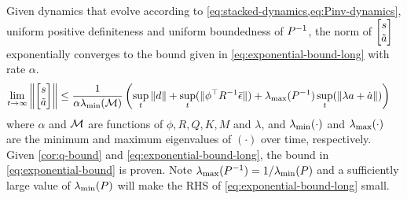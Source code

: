 \begin{theorem}
\label{thm:s-stability}
Given dynamics that evolve according to \cref{eq:stacked-dynamics,eq:Pinv-dynamics}, uniform positive definiteness and uniform boundedness of $P^{-1}$, the norm of $\begin{bmatrix}  s \\ \tilde{ a} \end{bmatrix}$ exponentially converges to the bound given in \cref{eq:exponential-bound-long} with rate $\alpha$.
\begin{align}
    \label{eq:exponential-bound-long}
    \lim_{t\rightarrow\infty}\left\|\begin{bmatrix}  s \\ \tilde{ a} \end{bmatrix}\right\| &\leq \frac{1}{\alpha \lambda_\text{\normalfont{min}}(\mathcal{M})}
    \left( \sup_t\| d\| + \sup_t(\|\phi^\top R^{-1} \bar{\epsilon}\|) + \lambda_\text{\normalfont{max}}(P^{-1})\sup_t(\|\lambda  a + \dot{ a}\|) \right)
\end{align}
where $\alpha$ and $\mathcal{M}$ are functions of $\phi, R, Q, K, M$ and $\lambda$, and $\lambda_\text{\normalfont{min}}(\cdot)$ and $\lambda_\text{\normalfont{max}}(\cdot)$ are the minimum and maximum eigenvalues of $(\cdot)$ over time, respectively. Given \cref{cor:q-bound} and \cref{eq:exponential-bound-long}, the bound in \cref{eq:exponential-bound} is proven. Note $\lambda_\text{\normalfont{max}}(P^{-1})=1/\lambda_\text{\normalfont{min}}(P)$ and a sufficiently large value of $\lambda_\text{\normalfont{min}}(P)$ will make the RHS of \cref{eq:exponential-bound-long} small.
\end{theorem}
